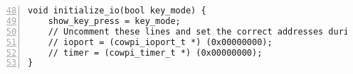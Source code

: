 \renewcommand{\firstline}{48}
\begin{lstlisting}[numberstyle=\color{gray}, numbers=left, firstnumber=\firstline]
void initialize_io(bool key_mode) {
    show_key_press = key_mode;
    // Uncomment these lines and set the correct addresses during lab time
    // ioport = (cowpi_ioport_t *) (0x00000000);
    // timer = (cowpi_timer_t *) (0x00000000);
}
\end{lstlisting}
